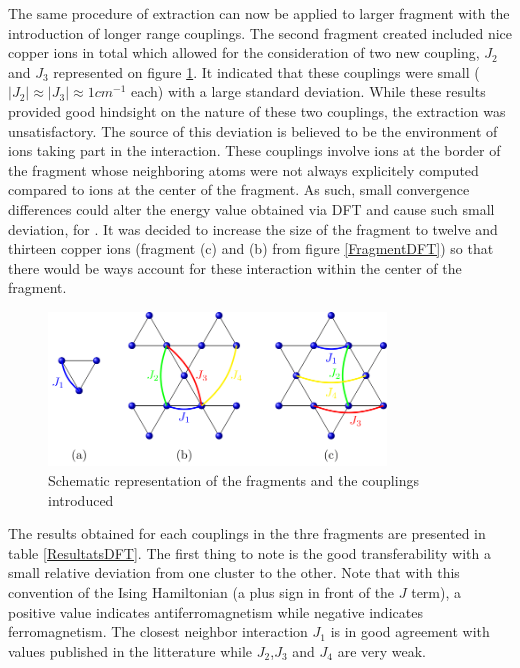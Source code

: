 \documentclass[10pt]{report}
\numberwithin{equation}{section}
\begin{document}
The same procedure of extraction can now be applied to larger fragment with the introduction of longer range couplings.
The second fragment created included nice copper ions in total which allowed for the consideration of two new coupling, $J_2$ and $J_3$ represented on figure \ref{CouplageDFT}.
It indicated that these couplings were small ($|J_{2}|\approx |J_{3}|\approx1 cm^{-1}$ each) with a large standard deviation.
While these results provided good hindsight on the nature of these two couplings, the extraction was unsatisfactory.
The source of this deviation is believed to be the environment of ions taking part in the interaction. 
These couplings involve ions at the border of the fragment whose neighboring atoms were not always explicitely computed compared to ions at the center of the fragment.
As such, small convergence differences could alter the energy value obtained via DFT and cause such small deviation, for .
It was decided to increase the size of the fragment to twelve and thirteen copper ions (fragment (c) and (b) from figure \ref{FragmentDFT}) so that there would be ways account for these interaction within the center of the fragment.


\begin{figure}[h!]
    \centering
    \includegraphics[width=0.8\textwidth]{Images/ModeleDFT_plan.png}
    \caption{Schematic representation of the fragments and the couplings introduced}
    \label{CouplageDFT}
\end{figure}

The results obtained for each couplings in the thre fragments are presented in table \ref{ResultatsDFT}.
The first thing to note is the good transferability with a small relative deviation from one cluster to the other.
Note that with this convention of the Ising Hamiltonian (a plus sign in front of the $J$ term), a positive value indicates antiferromagnetism while negative indicates ferromagnetism.
The closest neighbor interaction $J_1$ is in good agreement with values published in the litterature while $J_2$,$J_3$ and $J_4$ are very weak. 
\end{document}
